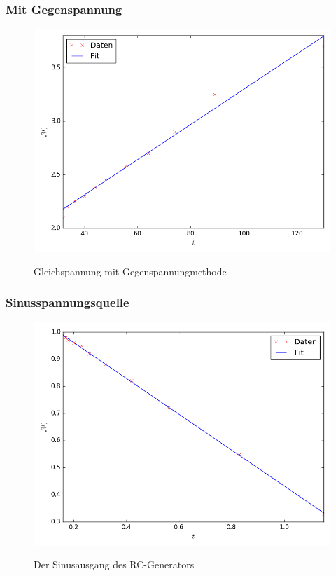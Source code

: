 \subsubsection{ Mit Gegenspannung}

\begin{figure}[H]
	\centering
	\caption{Gleichspannung mit Gegenspannungmethode}
	\includegraphics[width=\linewidth-150pt,height=\textheight-150pt,keepaspectratio]{GleichstromR.png}
	\label{fig:GleichstromR}
\end{figure}



\subsubsection{Sinusspannungsquelle}

\begin{figure}[H]
  \centering
  \caption{Der Sinusausgang des RC-Generators}
  \includegraphics[width=\linewidth-150pt,height=\textheight-150pt,keepaspectratio]{Sinus.png}
  \label{fig:Sinus}
\end{figure}


